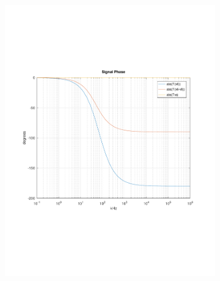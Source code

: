 \begin{figure}[h]
  \centering
  \begin{subfigure}{0.23\textwidth}
    \includegraphics[width=\linewidth, clip]{../mat/Transphase.pdf}
  \end{subfigure}
  \begin{subfigure}{0.23\textwidth}

\end{subfigure}
\end{figure}
